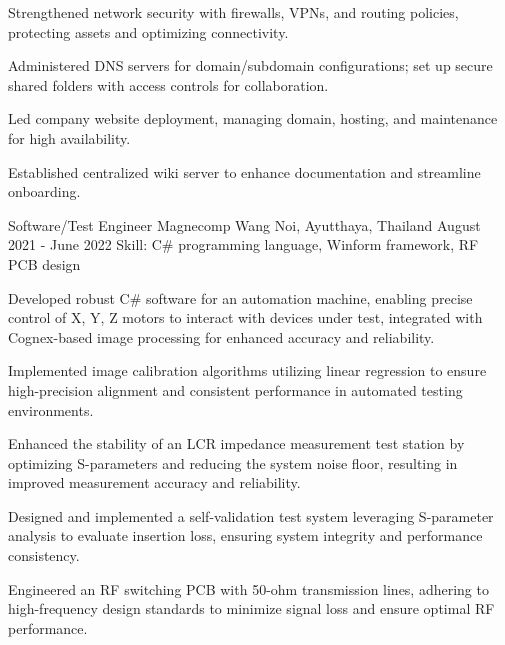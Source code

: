 \begin{cventries}
{\begin{cvitems}
      \item {Strengthened network security with firewalls, VPNs, and routing policies, protecting assets and optimizing connectivity.}
      \item {Administered DNS servers for domain/subdomain configurations; set up secure shared folders with access controls for collaboration.}
      \item {Led company website deployment, managing domain, hosting, and maintenance for high availability.}
      \item {Established centralized wiki server to enhance documentation and streamline onboarding.}
      \end{cvitems}
    }

  \cventry
    {Software/Test Engineer} %
    {Magnecomp} %
    {Wang Noi, Ayutthaya, Thailand} %
    {August 2021 - June 2022} %
    {Skill: C\# programming language, Winform framework, RF PCB design} %
    {
      \begin{cvitems} %
      \item {Developed robust C\# software for an automation machine, enabling precise control of X, Y, Z motors to interact with devices under test, integrated with Cognex-based image processing for enhanced accuracy and reliability.}
      \item {Implemented image calibration algorithms utilizing linear regression to ensure high-precision alignment and consistent performance in automated testing environments.}
      \item {Enhanced the stability of an LCR impedance measurement test station by optimizing S-parameters and reducing the system noise floor, resulting in improved measurement accuracy and reliability.}
      \item {Designed and implemented a self-validation test system leveraging S-parameter analysis to evaluate insertion loss, ensuring system integrity and performance consistency.}
      \item {Engineered an RF switching PCB with 50-ohm transmission lines, adhering to high-frequency design standards to minimize signal loss and ensure optimal RF performance.}
      \end{cvitems}
    }


\end{cventries}
